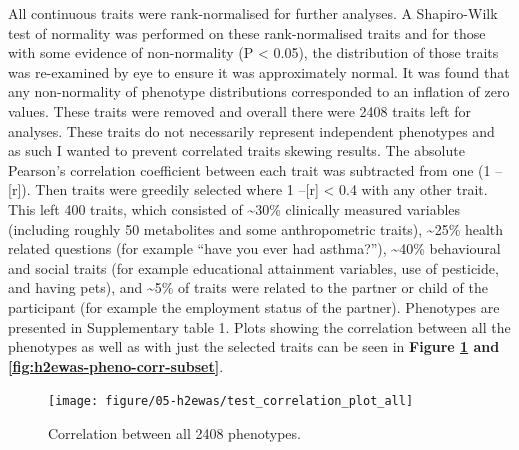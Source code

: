 \documentclass[11pt,oneside]{bristolthesis}
\begin{document}
All continuous traits were rank-normalised for further analyses. A Shapiro-Wilk test of normality was performed on these rank-normalised traits and for those with some evidence of non-normality (P \textless{} 0.05), the distribution of those traits was re-examined by eye to ensure it was approximately normal. It was found that any non-normality of phenotype distributions corresponded to an inflation of zero values. These traits were removed and overall there were 2408 traits left for analyses. These traits do not necessarily represent independent phenotypes and as such I wanted to prevent correlated traits skewing results. The absolute Pearson's correlation coefficient between each trait was subtracted from one (1 --{[}r{]}). Then traits were greedily selected where 1 --{[}r{]} \textless{} 0.4 with any other trait. This left 400 traits, which consisted of \textasciitilde30\% clinically measured variables (including roughly 50 metabolites and some anthropometric traits), \textasciitilde25\% health related questions (for example ``have you ever had asthma?''), \textasciitilde40\% behavioural and social traits (for example educational attainment variables, use of pesticide, and having pets), and \textasciitilde5\% of traits were related to the partner or child of the participant (for example the employment status of the partner). Phenotypes are presented in Supplementary table 1. Plots showing the correlation between all the phenotypes as well as with just the selected traits can be seen in \textbf{Figure \ref{fig:h2ewas-pheno-corr-all} and \ref{fig:h2ewas-pheno-corr-subset}}.


\begin{figure}

{\centering \texttt{[image: figure/05-h2ewas/test\_correlation\_plot\_all]} 

}

\caption{Correlation between all 2408 phenotypes.}\label{fig:h2ewas-pheno-corr-all}
\end{figure}
\end{document}
